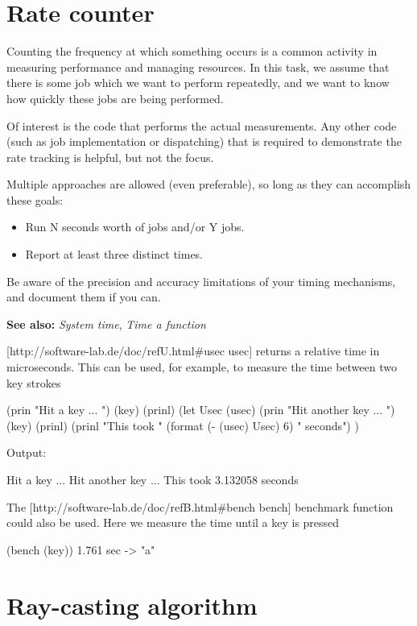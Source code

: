 \pagebreak{}
\section*{Rate counter}

Counting the frequency at which something occurs is a common activity in
measuring performance and managing resources. In this task, we assume
that there is some job which we want to perform repeatedly, and we want
to know how quickly these jobs are being performed.

Of interest is the code that performs the actual measurements. Any other
code (such as job implementation or dispatching) that is required to
demonstrate the rate tracking is helpful, but not the focus.

Multiple approaches are allowed (even preferable), so long as they can
accomplish these goals:

\begin{itemize}
\item
  Run N seconds worth of jobs and/or Y jobs.
\item
  Report at least three distinct times.
\end{itemize}

Be aware of the precision and accuracy limitations of your timing
mechanisms, and document them if you can.

\textbf{See also:} \emph{System time}, \emph{Time a function}

\begin{wideverbatim}

[http://software-lab.de/doc/refU.html#usec usec] returns a relative time in
microseconds. This can be used, for example, to measure the time between two key
strokes

(prin "Hit a key ... ")
(key)
(prinl)
(let Usec (usec)
   (prin "Hit another key ... ")
   (key)
   (prinl)
   (prinl "This took " (format (- (usec) Usec) 6) " seconds") )

Output:

Hit a key ...
Hit another key ...
This took 3.132058 seconds

The [http://software-lab.de/doc/refB.html#bench bench] benchmark function could
also be used. Here we measure the time until a key is pressed

(bench (key))
1.761 sec
-> "a"

\end{wideverbatim}

\pagebreak{}
\section*{Ray-casting algorithm}

